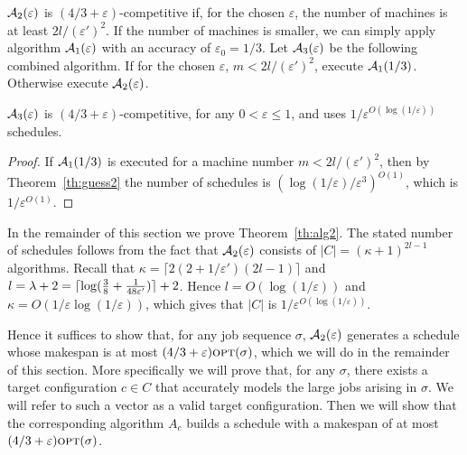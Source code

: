 \documentclass{llncs}
\newcommand{\OPT}{\text{{\sc opt}}}
\newcommand{\opt}{\OPT}
\newcommand{\eps}{\varepsilon}
\begin{document}
${\cal A}_2(\eps)$ is $(4/3+\eps)$-competitive if, for the chosen $\eps$, the number of machines is at least
$2l/(\eps')^2$. If the number of machines is smaller, we can simply apply algorithm ${\cal A}_1(\eps)$
with an accuracy of $\eps_0 = 1/3$. Let ${\cal A}_3(\eps)$ be the following combined algorithm. If for the
chosen $\eps$, $m< 2l/(\eps')^2$, execute ${\cal A}_1(1/3)$. Otherwise execute ${\cal A}_2(\eps)$.



\begin{corollary}\label{cor:A3}
${\cal A}_3(\eps)$ is $(4/3+\eps)$-competitive, for any $0< \eps \leq 1$, and uses $1/\eps^{O(\log (1/\eps))}$ 
schedules. 
\end{corollary}
\begin{proof}
If ${\cal A}_1(1/3)$ is executed for a machine number $m< 2l/(\eps')^2$, then by Theorem~\ref{th:guess2}
the number of schedules is $(\log (1/\eps)/\eps^3)^{O(1)}$, which is $1/\eps^{O(1)}$. \hspace*{\fill}{$\Box$}
\end{proof}

In the remainder of this section we prove Theorem~\ref{th:alg2}. The stated number of schedules follows from the 
fact that ${\cal A}_2(\eps)$  consists of $|C| = (\kappa+1)^{2l-1}$ algorithms. Recall that 
$\kappa = \lceil 2(2+1/\eps')(2l-1)\rceil$ and
$l = \lambda +2 = \lceil \log({3\over 8} + {1\over 48\eps'})\rceil +2$. Hence $l = O(\log (1/\eps))$
and $\kappa = O(1/\eps \log (1/\eps))$, which gives that $|C|$ is $1/\eps^{O(\log (1/\eps))}$.

Hence it suffices to show that, for any job sequence $\sigma$, ${\cal A}_2(\eps)$ generates
a schedule whose makespan is at most $(4/3+\eps)\opt(\sigma)$, which we will do in the remainder of this section. More specifically we will prove that, for any $\sigma$,
there exists a target configuration $c\in C$ that accurately models the large jobs arising in $\sigma$. We
will refer to such a vector as a valid target configuration. Then we will show that the corresponding algorithm 
$A_c$ builds a schedule with a makespan of at most $(4/3+\eps)\opt(\sigma)$. 
\end{document}
